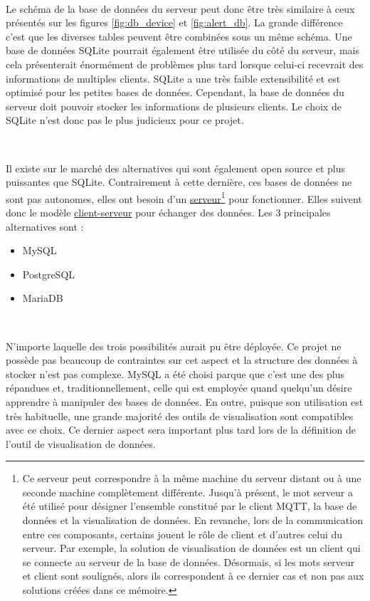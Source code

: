 ~

\noindent
Le schéma de la base de données du serveur peut donc être très similaire à ceux présentés sur les figures \ref{fig:db_device} et \ref{fig:alert_db}. La grande différence c'est que les diverses tables peuvent être combinées sous un même schéma. Une base de données SQLite pourrait également être utilisée du côté du serveur, mais cela présenterait énormément de problèmes plus tard lorsque celui-ci recevrait des informations de multiples clients. SQLite a une très faible extensibilité et est optimisé pour les petites bases de données. Cependant, la base de données du serveur doit pouvoir stocker les informations de plusieurs clients. Le choix de SQLite n'est donc pas le plus judicieux pour ce projet.

~

\noindent
Il existe sur le marché des alternatives qui sont également open source et plus puissantes que SQLite. Contrairement à cette dernière, ces bases de données ne sont pas autonomes, elles ont besoin d'un \underline{serveur}\footnote{Ce serveur peut correspondre à la même machine du serveur distant ou à une seconde machine complètement différente. Jusqu'à présent, le mot serveur a été utilisé pour désigner l'ensemble constitué par le client MQTT, la base de données et la visualisation de données. En revanche, lors de la communication entre ces composants, certains jouent le rôle de client et d'autres celui du serveur. Par exemple, la solution de visualisation de données est un client qui se connecte au serveur de la base de données. Désormais, si les mots serveur et client sont soulignés, alors ils correspondent à ce dernier cas et non pas aux solutions créées dans ce mémoire.} pour fonctionner. Elles suivent donc le modèle \underline{client-serveur} pour échanger des données. Les 3 principales alternatives sont :

\begin{itemize}
  \item MySQL
  \item PostgreSQL
  \item MariaDB
\end{itemize}

~

\noindent
N'importe laquelle des trois possibilités aurait pu être déployée. Ce projet ne possède pas beaucoup de contraintes sur cet aspect et la structure des données à stocker n'est pas complexe. MySQL a été choisi parque que c'est une des plus répandues et, traditionnellement, celle qui est employée quand quelqu'un désire apprendre à manipuler des bases de données. En outre, puisque son utilisation est très habituelle, une grande majorité des outils de visualisation sont compatibles avec ce choix. Ce dernier aspect sera important plus tard lors de la définition de l'outil de visualisation de données.

